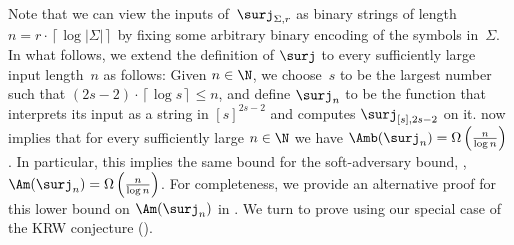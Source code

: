 \documentclass{toc}
\begin{document}
Note that we can view the inputs of~$\surj_{\Sigma,r}$ as binary
strings of length~$n=r\cdot\left\lceil \log\left|\Sigma\right|\right\rceil $
by fixing some arbitrary binary encoding of the symbols in~$\Sigma$.
In what follows, we extend the definition of $\surj$ to every sufficiently
large input length~$n$ as follows: Given $n\in\N$, we choose~$s$
to be the largest number such that $(2s-2)\cdot\left\lceil \log s\right\rceil \le n$,
and define $\surj_{n}$ to be the function that interprets its input
as a string in $\left[s\right]^{2s-2}$ and computes $\surj_{\left[s\right],2s-2}$
on it.  now implies that for every sufficiently large
$n\in\N$ we have $\Amb(\surj_{n})=\Omega\left(\frac{n}{\log n}\right)$.
In particular, this implies the same bound for the soft-adversary
bound, \ie, $\Am(\surj_{n})=\Omega\left(\frac{n}{\log n}\right)$.
For completeness, we provide an alternative proof for this lower bound
on $\Am(\surj_{n})$ in . We turn to prove
 using our special case of the KRW conjecture 
(). 
\end{document}
